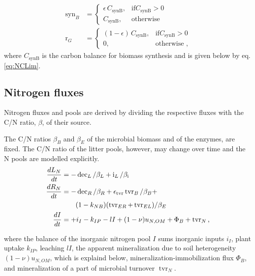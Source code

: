 \begin{subequations}
\label{eq:synB}
\begin{align}
\operatorname{syn}_B &= \begin{cases}
  \epsilon \, C_{\operatorname{synB}},  & \text{if} C_{\operatorname{synB}} >
  0\\
  C_{\operatorname{synB}}, & \text{otherwise}
\end{cases} \\  
\operatorname{r}_G &= \begin{cases}
  (1 - \epsilon) \, C_{\operatorname{synB}},  & \text{if}
  C_{\operatorname{synB}} > 0\\
  0, & \text{otherwise ,}
\end{cases}  
\end{align}
\end{subequations}
where $C_{\operatorname{synB}}$ is the carbon balance for biomass
synthesis and is given below by eq.
\ref{eq:NCLim}.



\subsection{Nitrogen fluxes}
Nitrogen fluxes and pools are derived by dividing the respective fluxes with the
C/N ratio, $\beta$, of their source.

The C/N ratios $\beta_B$ and $\beta_E$ of the microbial biomass and of the
enzymes, are fixed. The C/N ratio of the litter pools, however, may change over
time and the N pools are modelled explicitly.
\begin{subequations}
\label{eq:SEAMN}
\begin{align}
\frac{dL_N}{dt} &=  - \operatorname{dec}_L /\beta_{L} +
\operatorname{i}_L/\beta_{\operatorname{i}} 
\\
\frac{dR_N}{dt} &=  - \operatorname{dec}_R /\beta_{R} +
\epsilon_{\operatorname{tvr}} \operatorname{tvr}_B /\beta_{B} + \notag 
\\
& \qquad (1 -k_{NB}) (\operatorname{tvr}_{ER} +
\operatorname{tvr}_{EL})/\beta_{E} 
\\
\frac{dI}{dt} &= +i_I -k_{IP} -l I +(1-\nu) u_{N,OM} +\Phi_B +
\operatorname{tvr}_N
\text{,} 
\end{align}
\end{subequations}

\noindent where the balance of the inorganic nitrogen pool $I$ sums inorganic
inputs $i_I$, plant uptake $k_{IP}$, leaching $l I$, the apparent mineralization
due to soil heterogeneity $(1 -\nu) u_{N,OM}$, which is explaind below,
mineralization-immobilization flux $\Phi_B$, and mineralization of a part of
microbial turnover $\operatorname{tvr}_N$.

